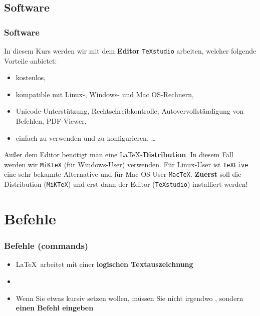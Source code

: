 \subsection{Software}

\begin{frame}
\frametitle{Software}

In diesem Kurs werden wir mit dem \textbf{Editor} \texttt{TeXstudio} arbeiten, welcher folgende Vorteile anbietet: 

\begin{itemize}
	\item kostenlos, 
	
	\item kompatible mit Linux-, Windows- und Mac OS-Rechnern,
	\item Unicode-Unterstützung, Rechtschreibkontrolle, Autovervollständigung von Befehlen, PDF-Viewer,
	\item einfach zu verwenden und zu konfigurieren, \dots
\end{itemize}

Außer dem Editor benötigt man eine \LaTeX -\textbf{Distribution}.
In diesem Fall werden wir \texttt{MiKTeX} (für Windows-User)
verwenden. Für Linux-User ist \texttt{TeXLive} eine sehr bekannte Alternative und für Mac OS-User \texttt{MacTeX}. \textbf{Zuerst} soll die Distribution (\zB \texttt{MiKTeX}) und erst dann der Editor (\zB \texttt{TeXstudio}) installiert werden!

\end{frame}


\section{Befehle}

\begin{frame}[fragile]
\frametitle{Befehle (commands)}


\begin{itemize}
	\item \LaTeX\ arbeitet mit einer \textbf{logischen Textauszeichnung}
	
	\item[]
	
	\item Wenn Sie etwas kursiv setzen wollen, müssen Sie nicht irgendwo , sondern \textbf{einen Befehl eingeben}
\end{itemize}

\end{frame}


